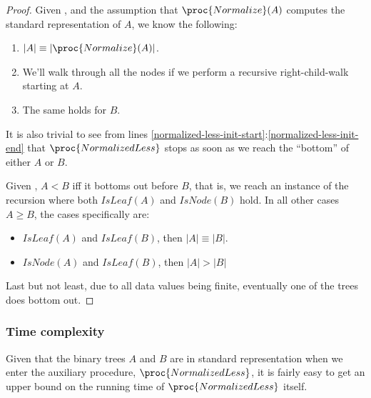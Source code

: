 \begin{proof}

Given , and the assumption that
$\proc{Normalize}(A)$ computes the standard representation of $A$, we know the
following:

\begin{enumerate}

\item $\left|A\right|\equiv\left|\proc{Normalize}(A)\right|$.

\item We'll walk through all the nodes if we perform a recursive
right-child-walk starting at $A$.

\item The same holds for $B$.

\end{enumerate}

It is also trivial to see from lines
\ref{normalized-less-init-start}:\ref{normalized-less-init-end} that
$\proc{NormalizedLess}$ stops as soon as we reach the ``bottom'' of either $A$
or $B$.

Given , $A<B$ iff it bottoms out before $B$, that is,
we reach an instance of the recursion where both $IsLeaf(A)$ and $IsNode(B)$
hold.  In all other cases $A\geq B$, the cases specifically are:

\begin{itemize}

\item $IsLeaf(A)$ and $IsLeaf(B)$, then $\left|A\right|\equiv \left|B\right|$.

\item $IsNode(A)$ and $IsLeaf(B)$, then $\left|A\right|>\left|B\right|$

\end{itemize}

Last but not least, due to all data values being finite, eventually one of the
trees does bottom out.

\end{proof}

\subsubsection{Time complexity}

Given that the binary trees $A$ and $B$ are in standard representation when we
enter the auxiliary procedure, $\proc{NormalizedLess}$, it is fairly easy to
get an upper bound on the running time of $\proc{NormalizedLess}$ itself.

